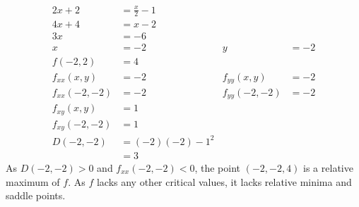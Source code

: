 \documentclass[11pt]{article}
\begin{document}
\begin{enumerate}
\begin{itemize}[ ]
\begin{align*}
							2x + 2 &= \frac{x}{2} - 1 \\
							4x + 4 &= x - 2 \\
							3x &= -6 \\
							x &= -2 &
								y &= -2 \\
						f(-2, 2) &= 4 \\
						f_{xx}(x, y) &= -2 &
							f_{yy}(x, y) &= -2 \\
						f_{xx}(-2, -2) &= -2 &
							f_{yy}(-2, -2) &= -2 \\
						f_{xy}(x, y) &= 1 \\
						f_{xy}(-2, -2) &= 1 \\
						D(-2,-2) &= (-2)(-2) - 1^2 \\
							&= 3
					\end{align*}
					As $D(-2, -2) > 0$ and $f_{xx}(-2, -2) < 0$, the point $(-2, -2, 4)$ is a relative maximum of $f$. As $f$ lacks any other critical values, it lacks relative minima and saddle points.
			\end{itemize}
	\end{enumerate}
\end{document}
